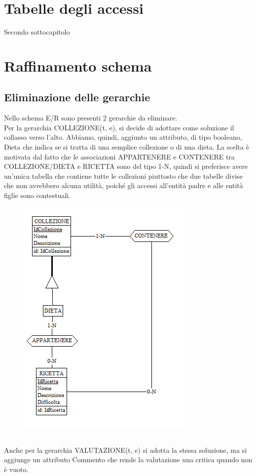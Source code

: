 ﻿\documentclass[a4paper,12pt]{report}
\begin{document}
\section{Tabelle degli accessi}
Secondo sottocapitolo
\section{Raffinamento schema}
\subsection{Eliminazione delle gerarchie}
Nello schema E/R sono presenti 2 gerarchie da eliminare.\\
Per la gerarchia COLLEZIONE(t, e), si decide di adottare come soluzione il collasso verso l'alto.
Abbiamo, quindi, aggiunto un attributo, di tipo booleano, Dieta che indica se si tratta di una semplice collezione o di una dieta.
La scelta è motivata dal fatto che le associazioni APPARTENERE e CONTENERE tra COLLEZIONE/DIETA e RICETTA sono del tipo 1-N, quindi si preferisce avere
un'unica tabella che contiene tutte le collezioni piuttosto che due tabelle divise che non avrebbero alcuna utilità, poiché gli accessi all'entità padre e alle entità figlie sono contestuali.\\
\begin{figure}[h!]
    \centering
    \includegraphics[width=0.5\linewidth]{app_images/gerarchia_collezione.png}
\end{figure}
\\Anche per la gerarchia VALUTAZIONE(t, e) si adotta la stessa soluzione, ma si aggiunge un attributo Commento che rende la valutazione una critica quando non è vuoto.\\
\end{document}
